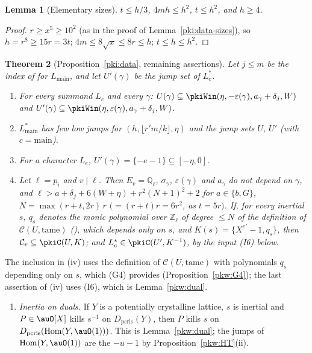 \documentclass[10pt]{amsart}
\newtheorem{theorem}{Theorem}[section]
\newtheorem{lemma}[theorem]{Lemma}
\theoremstyle{definition}
\theoremstyle{remark}
\newcommand{\Z}{\mathbb Z}
\newcommand{\Q}{\mathbb Q}
\begin{document}
\begin{lemma}[Elementary sizes]\label{pkd:sizes}
$t\le h/3$, $4m h\le h^2$, $t\le h^2$, and $h\ge4$.
\end{lemma}

\begin{proof}
$r\ge x^5\ge10^2$ (as in the proof of Lemma~\ref{pki:data-sizes}), so $h=r^8\ge15r=3t$; $4m\le
8\sqrt x\le8r\le h$; $t\le h\le h^2$.
\end{proof}

\begin{theorem}[Proposition~\ref{pki:data}, remaining assertions]\label{pkd:data}
Let $j\le m$ be the index of {\cite[Definition~2.6(M2)]{P55}} for $L_{\mathrm{main}}$, and let
$U'(\gamma)$ be the jump set of $L_c^*$.
\begin{enumerate}
\item[(i)] For every summand $L_c$ and every $\gamma$: $U(\gamma)\subseteq\pkiWin(\eta,-\varepsilon(\gamma),
a_\gamma+\delta_j,W)$ and $U'(\gamma)\subseteq\pkiWin(\eta,\varepsilon(\gamma),a_\gamma+\delta_j,W)$.
\item[(ii)] $L_{\mathrm{main}}^*$ has few low jumps for $(h,\lfloor r'm/k\rfloor,\eta)$ and the jump sets
$U$, $U'$ (with $c=\mathrm{main}$).
\item[(iii)] For a character $L_e$, $U'(\gamma)=\{-e-1\}\subseteq[-\eta,0]$.
\item[(iv)] Let $\ell=p_i$ and $v\mid\ell$. Then $E_v=\Q_\ell$, $\sigma_\gamma$, $\varepsilon(\gamma)$ and
$a_\gamma$ do not depend on $\gamma$, and $\ell>a+\delta_j+6(W+\eta)+r^2(N+1)^2+2$ for $a\in\{b,G\}$,
$N=\max(r+t,2r)\,r$ $(=(r+t)r=6r^2$, as $t=5r)$. If, for every inertial $s$, $q_s$ denotes the monic polynomial over $\Z_\ell$ of degree
$\le N$ of the definition of $\mathcal C(U,\mathrm{tame})$ ({\cite[\S5]{P55}}), which depends only on $s$, and
$K(s)=\{X^{e'}-1,q_s\}$, then $\mathcal C_v\subseteq\pkiC(U,K)$; and $L_c^*\in\pkiC(U',K^{-1})$, by
the input (I6) below.
\end{enumerate}
\end{theorem}

The inclusion in (iv) uses the definition of $\mathcal C(U,\mathrm{tame})$ with polynomials $q_s$
depending only on $s$, which (G4) provides (Proposition~\ref{pkw:G4}); the last assertion of (iv)
uses (I6), which is Lemma~\ref{pkw:dual}.

\begin{enumerate}
\item[(I6)] \emph{Inertia on duals.} If $Y$ is a potentially crystalline lattice, $s$ is inertial and
$P\in\auO[X]$ kills $s^{-1}$ on $D_{\mathrm{pcris}}(Y)$, then $P$ kills $s$ on
$D_{\mathrm{pcris}}(\operatorname{Hom}(Y,\auO(1)))$. This is Lemma~\ref{pkw:dual}; the jumps of
$\operatorname{Hom}(Y,\auO(1))$ are the $-u-1$ by Proposition~\ref{pkw:HT}(ii).
\end{enumerate}
\end{document}
